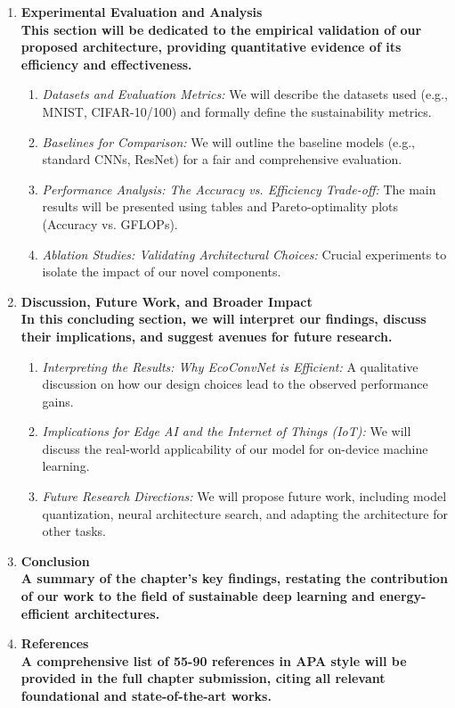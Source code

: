 \documentclass[12pt, a4paper]{article}
\begin{document}
\begin{enumerate}
    \item \large\bfseries Experimental Evaluation and Analysis \\
    \normalfont This section will be dedicated to the empirical validation of our proposed architecture, providing quantitative evidence of its efficiency and effectiveness.
    \begin{enumerate}
        \item \textit{Datasets and Evaluation Metrics:} We will describe the datasets used (e.g., MNIST, CIFAR-10/100) and formally define the sustainability metrics.
        \item \textit{Baselines for Comparison:} We will outline the baseline models (e.g., standard CNNs, ResNet) for a fair and comprehensive evaluation.
        \item \textit{Performance Analysis: The Accuracy vs. Efficiency Trade-off:} The main results will be presented using tables and Pareto-optimality plots (Accuracy vs. GFLOPs).
        \item \textit{Ablation Studies: Validating Architectural Choices:} Crucial experiments to isolate the impact of our novel components.
    \end{enumerate}

    \item \large\bfseries Discussion, Future Work, and Broader Impact \\
    \normalfont In this concluding section, we will interpret our findings, discuss their implications, and suggest avenues for future research.
    \begin{enumerate}
        \item \textit{Interpreting the Results: Why EcoConvNet is Efficient:} A qualitative discussion on how our design choices lead to the observed performance gains.
        \item \textit{Implications for Edge AI and the Internet of Things (IoT):} We will discuss the real-world applicability of our model for on-device machine learning.
        \item \textit{Future Research Directions:} We will propose future work, including model quantization, neural architecture search, and adapting the architecture for other tasks.
    \end{enumerate}

    \item \large\bfseries Conclusion \\
    \normalfont A summary of the chapter's key findings, restating the contribution of our work to the field of sustainable deep learning and energy-efficient architectures.

    \item \large\bfseries References \\
    \normalfont A comprehensive list of 55-90 references in APA style will be provided in the full chapter submission, citing all relevant foundational and state-of-the-art works.
\end{enumerate}
\end{document}
